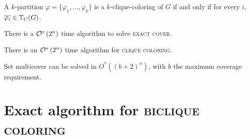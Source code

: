 \begin{lemma}
    \label{lem:clique_transversal_colorings}
    A $k$-partition $\varphi = \{\varphi_1, \dots, \varphi_k\}$ is a $k$-clique-coloring of $G$ if and only if for every $i$, $\overline{\varphi_i} \in \mathbb{T}_{C}(G)$.
\end{lemma}


\begin{theorem}
    \label{thm:inc_exc}
    There is a $\mathcal{O}^*\left(2^n\right)$ time algorithm to solve \textsc{exact cover}.
\end{theorem}

\begin{theorem}
    \label{thm:clique_color_algorithm}
    There is an $\mathcal{O}^*\left(2^n\right)$ time algorithm for \textsc{clique coloring}.
\end{theorem}



\begin{theorem}
    \label{thm:set_multicover}
    Set multicover can be solved in $O^*((b+2)^n)$, with $b$ the maximum coverage requirement.
\end{theorem}

\section{Exact algorithm for \textsc{biclique coloring}}
\label{sec:biclique_exact}

